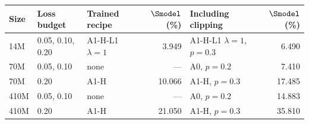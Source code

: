 \begin{tabular}{@{}lllrlr@{}}
\toprule
Size & Loss budget & Trained recipe & $\Smodel$ (\%) & Including clipping & $\Smodel$ (\%) \\
\midrule
14M & 0.05, 0.10, 0.20 & A1-H-L1 $\lambda=1$ & 3.949 & A1-H-L1 $\lambda=1$, $p=0.3$ & 6.490 \\
70M & 0.05, 0.10 & none & --- & A0, $p=0.2$ & 7.410 \\
70M & 0.20 & A1-H & 10.066 & A1-H, $p=0.3$ & 17.485 \\
410M & 0.05, 0.10 & none & --- & A0, $p=0.2$ & 14.883 \\
410M & 0.20 & A1-H & 21.050 & A1-H, $p=0.3$ & 35.810 \\
\bottomrule
\end{tabular}
